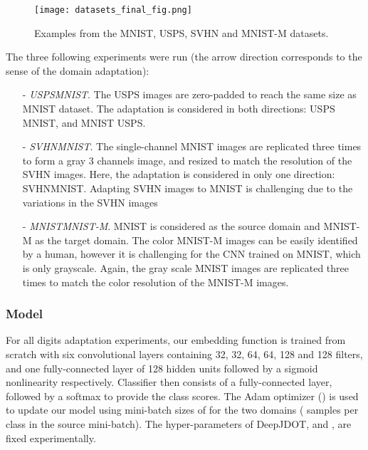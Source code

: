 \documentclass[runningheads]{llncs}
\begin{document}
\begin{figure}
\centering
\texttt{[image: datasets\_final\_fig.png]}
\caption{Examples from the MNIST, USPS, SVHN and MNIST-M datasets.}
\label{fig:datasets}
\end{figure}


\noindent The three following experiments were run (the arrow direction corresponds to the sense of the domain adaptation):
\begin{itemize}
\item[-] \emph{USPSMNIST}. The USPS images are zero-padded to reach the same size as MNIST dataset.
The adaptation is considered in both directions: USPS  MNIST, and MNIST  USPS.

\item[-] \emph{SVHNMNIST}. The single-channel MNIST images are replicated three times to form a gray 3 channels image, and resized to match the resolution of the SVHN images. Here, the adaptation is considered in only one direction: SVHNMNIST. Adapting SVHN images to MNIST is challenging due to the variations in the SVHN images \cite{Ganin2016}  
\item[-] \emph{MNISTMNIST-M}. MNIST is considered as the source domain and MNIST-M as the target domain. The color MNIST-M images can be easily identified by a human, however it is challenging for the CNN trained on MNIST, which is only grayscale. Again, the gray scale MNIST images are replicated three times to match the color resolution of the MNIST-M images.
\end{itemize}

\subsubsection*{Model} For all digits adaptation experiments, our embedding function  is trained from scratch with six  convolutional layers containing 32, 32, 64, 64, 128 and 128 filters, and one fully-connected layer of 128 hidden units followed by a sigmoid nonlinearity respectively. Classifier  then consists of a fully-connected layer, followed by a softmax to provide the class scores.
The Adam optimizer () is used to update our model using mini-batch sizes of  for the two domains ( samples per class in the source mini-batch). The hyper-parameters of DeepJDOT,  and , are fixed experimentally. 
\end{document}

